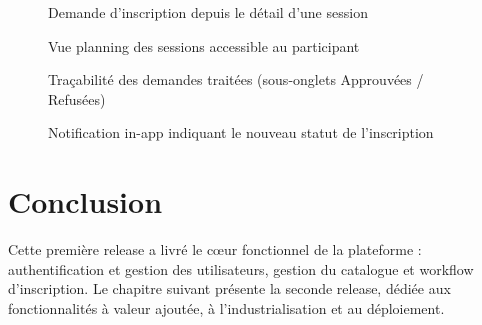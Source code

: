\begin{figure}[H]\centering
  \caption{Demande d'inscription depuis le détail d'une session}\label{fig:demande-insc}
\end{figure}

\begin{figure}[H]\centering
  \caption{Vue planning des sessions accessible au participant}\label{fig:planning}
\end{figure}

\begin{figure}[H]\centering
  \caption{Traçabilité des demandes traitées (sous-onglets Approuvées / Refusées)}\label{fig:val-tabs}
\end{figure}

\begin{figure}[H]\centering
  \caption{Notification in-app indiquant le nouveau statut de l'inscription}\label{fig:notif-inapp}
\end{figure}

\section*{Conclusion}
Cette première release a livré le cœur fonctionnel de la plateforme : authentification et
gestion des utilisateurs, gestion du catalogue et workflow d'inscription. Le chapitre suivant
présente la seconde release, dédiée aux fonctionnalités à valeur ajoutée, à l'industrialisation
et au déploiement.
\clearpage